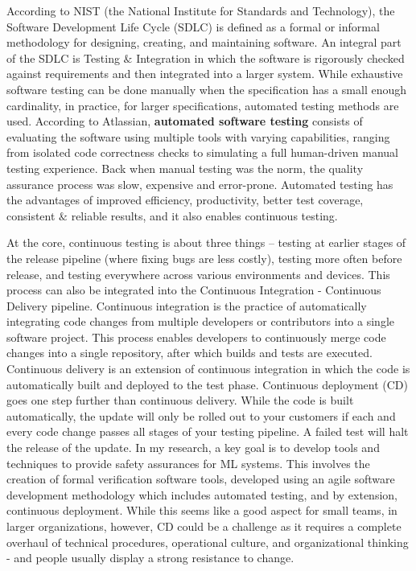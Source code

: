 \documentclass[11pt]{article}
\begin{document}
\par{According to NIST (the National Institute for Standards and Technology), the Software Development Life Cycle (SDLC) is defined as a formal or informal methodology for designing, creating, and maintaining software. An integral part of the SDLC is Testing $\&$ Integration in which the software is rigorously checked against requirements and then integrated into a larger system. While exhaustive software testing can be done manually when the specification has a small enough cardinality, in practice, for larger specifications, automated testing methods are used. According to Atlassian, \textbf{automated software testing} consists of evaluating the software using multiple tools with varying capabilities, ranging from isolated code correctness checks to simulating a full human-driven manual testing experience. Back when manual testing was the norm, the quality assurance process was slow, expensive and error-prone. Automated testing has the advantages of improved efficiency, productivity, better test coverage, consistent $\&$ reliable results, and it also enables continuous testing.  }
\\
\par{At the core, continuous testing is about three things – testing at earlier stages of the release pipeline (where fixing bugs are less costly), testing more often before release, and testing everywhere across various environments and devices. This process can also be integrated into the Continuous Integration - Continuous Delivery pipeline. Continuous integration  is the practice of automatically integrating code changes from multiple developers or contributors into a single software project. This process enables developers to continuously merge code changes into a single repository, after which builds and tests are executed. Continuous delivery is an extension of continuous integration in which the code is automatically built and deployed to the test phase. Continuous deployment (CD) goes one step further than continuous delivery. While the code is built automatically, the update will only be rolled out to your customers if each and every code change passes all stages of your testing pipeline. A failed test will halt the release of the update. In my research, a key goal is to develop tools and techniques to provide safety assurances for ML systems. This involves the creation of formal verification software tools, developed using an agile software development methodology which includes automated testing, and by extension, continuous deployment. While this seems like a good aspect for small teams, in larger organizations, however, CD could be a challenge as it requires a complete overhaul of technical procedures, operational culture, and organizational thinking - and people usually display a strong resistance to change.}
\end{document}
